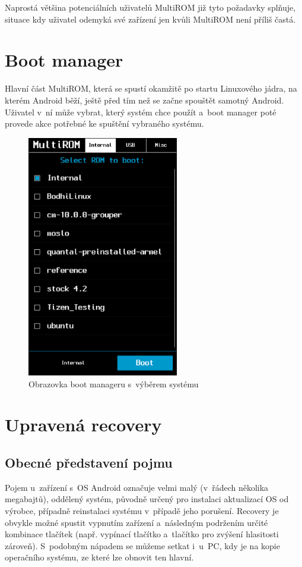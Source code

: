 \documentclass[12pt, a4paper, oneside]{article}
\begin{document}
Naprostá většina potenciálních uživatelů MultiROM již tyto požadavky splňuje, situace kdy uživatel odemyká své zařízení jen kvůli MultiROM není příliš častá.

\newpage
\section{Boot manager}
Hlavní část MultiROM, která se spustí okamžitě po startu Linuxového jádra, na kterém Android běží, ještě před tím než se začne spouštět samotný Android. Uživatel v~ní může vybrat, který systém chce použít a~boot manager poté provede akce potřebné ke spuštění vybraného systému.

\begin{figure}[H]
\begin{center}
 \includegraphics[width=250px]{img/boot_manager.png}
\caption{Obrazovka boot manageru s~výběrem systému}
\end{center}
\end{figure}

\section{Upravená recovery}
\subsection{Obecné představení pojmu}
Pojem  u~zařízení s~OS Android označuje velmi malý (v~řádech několika megabajtů), oddělený systém, původně určený pro instalaci aktualizací OS od výrobce, případně reinstalaci systému v~případě jeho porušení. Recovery je obvykle možné spustit vypnutím zařízení a~následným podržením určité kombinace tlačítek (např. vypínací tlačítko a~tlačítko pro zvýšení hlasitosti zároveň). S~podobným nápadem se můžeme setkat i~u~PC, kdy je na  kopie operačního systému, ze které lze obnovit ten hlavní.
\end{document}
